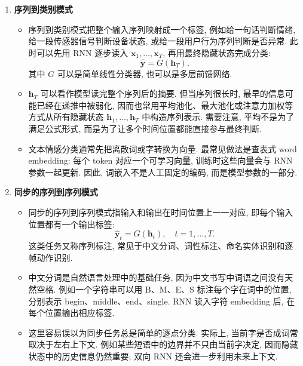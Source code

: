 \documentclass{../nndlcourse}
\begin{document}
\begin{enumerate}
\item \textbf{序列到类别模式}
  \begin{itemize}
    \item 序列到类别模式把整个输入序列映射成一个标签, 例如给一句话判断情绪, 给一段传感器信号判断设备状态, 或给一段用户行为序列判断是否异常. 此时可以先用 RNN 逐步读入 $\boldsymbol{x}_1,\ldots,\boldsymbol{x}_T$, 再用最终隐藏状态完成分类:
    \begin{equation*}
      \hat{\boldsymbol{y}} = G(\boldsymbol{h}_T).
    \end{equation*}
    其中 $G$ 可以是简单线性分类器, 也可以是多层前馈网络.
    \item $\boldsymbol{h}_T$ 可以看作模型读完整个序列后的摘要. 但当序列很长时, 最早的信息可能已经在递推中被弱化, 因而也常用平均池化、最大池化或注意力加权等方式从所有隐藏状态 $\boldsymbol{h}_1,\ldots,\boldsymbol{h}_T$ 中构造序列表示. 需要注意, 平均不是为了满足公式形式, 而是为了让多个时间位置都能直接参与最终判断.
    \item 文本情感分类通常先把离散词或字转换为向量. 最常见做法是查表式 word embedding: 每个 token 对应一个可学习向量, 训练时这些向量会与 RNN 参数一起更新. 因此, 词嵌入不是人工固定的编码, 而是模型参数的一部分.
  \end{itemize}

\item \textbf{同步的序列到序列模式}
  \begin{itemize}
    \item 同步的序列到序列模式指输入和输出在时间位置上一一对应, 即每个输入位置都有一个输出标签:
    \begin{equation*}
      \hat{\boldsymbol{y}}_t = G(\boldsymbol{h}_t), \quad t=1,\ldots,T.
    \end{equation*}
    这类任务又称序列标注, 常见于中文分词、词性标注、命名实体识别和逐帧动作识别.
    \item 中文分词是自然语言处理中的基础任务, 因为中文书写中词语之间没有天然空格. 例如一个字符串可以用 B、M、E、S 标注每个字在词中的位置, 分别表示 begin、middle、end、single. RNN 读入字符 embedding 后, 在每个位置输出相应标签.
    \item 这里容易误以为同步任务总是简单的逐点分类. 实际上, 当前字是否成词常取决于左右上下文. 例如某些短语中的边界并不只由当前字决定, 因而隐藏状态中的历史信息仍然重要; 双向 RNN 还会进一步利用未来上下文.
  \end{itemize}


\end{enumerate}
\end{document}
